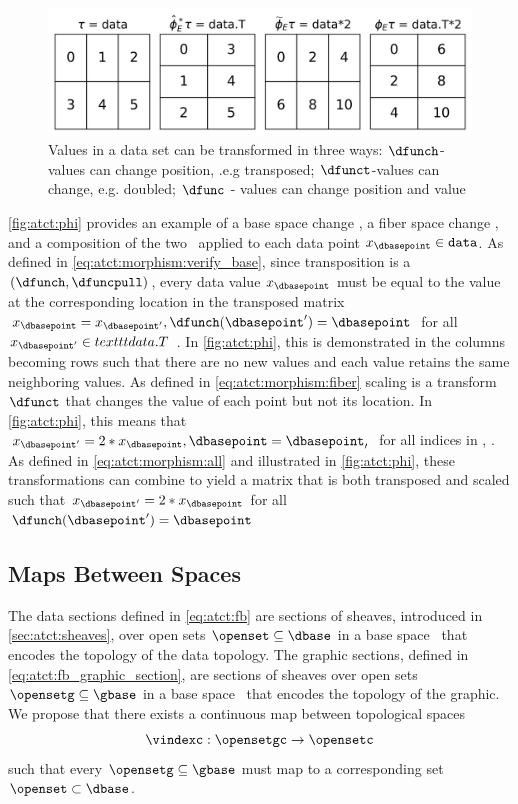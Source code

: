 \documentclass[10pt,journal,compsoc]{IEEEtran}
\theoremstyle{definition}
\theoremstyle{remark}
\begin{document}
\begin{figure}[h!]
  \label{fig:atct:phi}
  \includegraphics[width=\columnwidth]{phi.png}
  \caption{Values in a data set can be transformed in three ways: $\dfunch$-values can change position, .e.g transposed;  $\dfunct$-values can change, e.g. doubled; $\dfunc$ - values can change position and value}
\end{figure}
\autoref{fig:atct:phi} provides an example of a base space change \dfunch, a fiber space change \dfunct, and a composition of the two \dfunc\ applied to each data point $x_{\dbasepoint} \in \texttt{data}$. As defined in \autoref{eq:atct:morphism:verify_base}, 
since transposition is a $(\dfunch, \dfuncpull)$, every data value $x_{\dbasepoint}$ must be equal to the value at the corresponding location in the transposed matrix $x_{\dbasepoint} = x_{\dbasepoint^{\prime}}, \dfunch(\dbasepoint^{\prime}) = \dbasepoint$ for all $x_{\dbasepoint^{\prime}} \in texttt{data.T}$ . In \autoref{fig:atct:phi}, this is demonstrated in the columns becoming rows such that there are no new values and each value retains the same neighboring values. As defined in \autoref{eq:atct:morphism:fiber} scaling is a transform $\dfunct$ that changes the value of each point but not its location. In \autoref{fig:atct:phi}, this means that $x_{\dbasepoint^{\prime}}= 2*x_{\dbasepoint}, \dbasepoint = \dbasepoint_{\prime}$ for all indices in , . As defined in \autoref{eq:atct:morphism:all} and illustrated in \autoref{fig:atct:phi}, these transformations can combine to yield a matrix that is both transposed and scaled such that $x_{\dbasepoint^{\prime}} = 2*x_{\dbasepoint}$ for all  
$\dfunch(\dbasepoint^{\prime}) = \dbasepoint$

\subsection{Maps Between Spaces}
\label{sec:atct:xi}
The data sections defined in \autoref{eq:atct:fb} are sections of sheaves, introduced in \autoref{sec:atct:sheaves}, over open sets $\openset \subseteq \dbase$ in a base space \dbase\ that encodes the topology of the data topology. The graphic sections, defined in \autoref{eq:atct:fb_graphic_section}, are sections of sheaves over open sets $\opensetg \subseteq \gbase$ in a base space \gbase\ that encodes the topology of the graphic. We propose that there exists a continuous \textcolor{functor}{map between topological spaces} \vindexc 
\begin{equation}
  \label{eq:atct:xi}
  \vindexc: \opensetgc \rightarrow \opensetc 
\end{equation}
such that every $\opensetg \subseteq \gbase$ must map to a corresponding set $\openset \subset \dbase$. 
\end{document}

